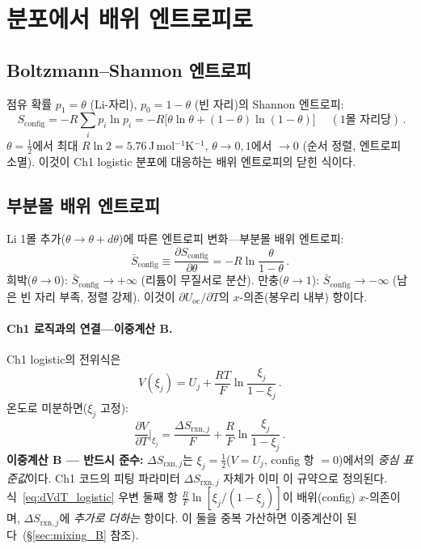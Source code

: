 \documentclass[11pt,a4paper]{article}
\newcommand{\rxn}{\mathrm{rxn}}
\newcommand{\oc}{\mathrm{oc}}
\newcommand{\config}{\mathrm{config}}
\begin{document}
\section{분포에서 배위 엔트로피로}\label{sec:config}

\subsection{Boltzmann--Shannon 엔트로피}\label{ssec:boltzmann}

점유 확률 $p_1=\theta$ (Li-자리), $p_0=1-\theta$ (빈 자리)의 Shannon 엔트로피:
\begin{equation}
  \boxed{\;S_\config = -R\sum_i p_i\ln p_i
    = -R\bigl[\theta\ln\theta+(1-\theta)\ln(1-\theta)\bigr]\;}\quad
    (\text{1몰 자리당})\,.
  \label{eq:Sconfig}
\end{equation}
$\theta=\frac{1}{2}$에서 최대 $R\ln2=5.76$\,J\,mol$^{-1}$K$^{-1}$,
$\theta\to0,1$에서 $\to0$ (순서 정렬, 엔트로피 소멸).
이것이 Ch1 logistic 분포에 대응하는 배위 엔트로피의 닫힌 식이다.

\subsection{부분몰 배위 엔트로피}\label{ssec:partial_molar}

Li 1몰 추가($\theta\to\theta+d\theta$)에 따른 엔트로피 변화---부분몰 배위 엔트로피:
\begin{equation}
  \bar{S}_\config \equiv \frac{\partial S_\config}{\partial\theta}
    = -R\ln\frac{\theta}{1-\theta}\,.
  \label{eq:partial_S}
\end{equation}
희박($\theta\to0$): $\bar{S}_\config\to+\infty$ (리튬이 무질서로 분산).
만충($\theta\to1$): $\bar{S}_\config\to-\infty$ (남은 빈 자리 부족, 정렬 강제).
이것이 $\partial U_{\oc}/\partial T$의 $x$-의존(봉우리 내부) 항이다.

\paragraph{Ch1 로직과의 연결---이중계산 B.}

Ch1 logistic의 전위식은
\begin{equation}
  V(\xi_j)=U_j+\frac{RT}{F}\ln\frac{\xi_j}{1-\xi_j}\,.
  \label{eq:V_logistic}
\end{equation}
온도로 미분하면($\xi_j$ 고정):
\begin{equation}
  \frac{\partial V}{\partial T}\bigg|_{\xi_j}
    =\frac{\Delta S_{\rxn,j}}{F}+\frac{R}{F}\ln\frac{\xi_j}{1-\xi_j}\,.
  \label{eq:dVdT_logistic}
\end{equation}
\textbf{이중계산 B --- 반드시 준수:}
$\Delta S_{\rxn,j}$는 $\xi_j=\frac{1}{2}$($V=U_j$, config 항 $=0$)에서의 \emph{중심 표준값}이다.
Ch1 코드의 피팅 파라미터 $\Delta S_{\rxn,j}$ 자체가 이미 이 규약으로 정의된다.
식~\eqref{eq:dVdT_logistic} 우변 둘째 항 $\frac{R}{F}\ln[\xi_j/(1-\xi_j)]$이
배위(config) $x$-의존이며, $\Delta S_{\rxn,j}$에 \emph{추가로 더하는} 항이다.
이 둘을 중복 가산하면 이중계산이 된다~(\S\ref{sec:mixing_B} 참조).
\end{document}
